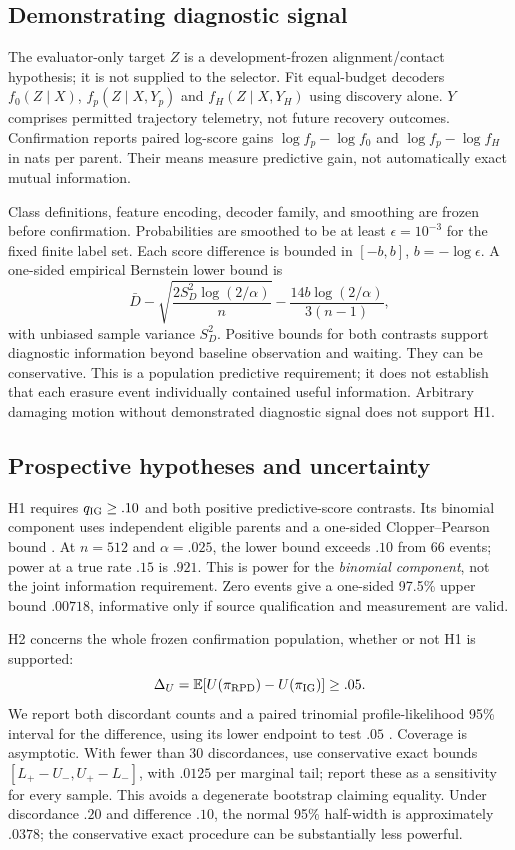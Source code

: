 \documentclass[conference]{IEEEtran}
\newcommand{\E}{\mathbb E}
\begin{document}
\subsection{Demonstrating diagnostic signal}
The evaluator-only target $Z$ is a development-frozen alignment/contact hypothesis; it is not supplied to the selector. Fit equal-budget decoders $f_0(Z\mid X)$, $f_p(Z\mid X,Y_p)$ and $f_H(Z\mid X,Y_H)$ using discovery alone. $Y$ comprises permitted trajectory telemetry, not future recovery outcomes. Confirmation reports paired log-score gains $\log f_p-\log f_0$ and $\log f_p-\log f_H$ in nats per parent. Their means measure predictive gain, not automatically exact mutual information.

Class definitions, feature encoding, decoder family, and smoothing are frozen before confirmation. Probabilities are smoothed to be at least $\epsilon=10^{-3}$ for the fixed finite label set. Each score difference is bounded in $[-b,b]$, $b=-\log\epsilon$. A one-sided empirical Bernstein lower bound \citep{maurer2009} is
\begin{equation}
\bar D-\sqrt{\frac{2S_D^2\log(2/\alpha)}{n}}
-\frac{14b\log(2/\alpha)}{3(n-1)},\label{eq:score}
\end{equation}
with unbiased sample variance $S_D^2$. Positive bounds for both contrasts support diagnostic information beyond baseline observation and waiting. They can be conservative. This is a population predictive requirement; it does not establish that each erasure event individually contained useful information. Arbitrary damaging motion without demonstrated diagnostic signal does not support H1.

\subsection{Prospective hypotheses and uncertainty}
H1 requires $q_{\rm IG}\ge .10$ and both positive predictive-score contrasts. Its binomial component uses independent eligible parents and a one-sided Clopper--Pearson bound \citep{clopper1934}. At $n=512$ and $\alpha=.025$, the lower bound exceeds $.10$ from 66 events; power at a true rate $.15$ is $.921$. This is power for the \emph{binomial component}, not the joint information requirement. Zero events give a one-sided 97.5\% upper bound $.00718$, informative only if source qualification and measurement are valid.

H2 concerns the whole frozen confirmation population, whether or not H1 is supported:
\begin{equation}
\Delta_U=\E[U(\pi_{\rm RPD})-U(\pi_{\rm IG})]\ge .05.\label{eq:H2}
\end{equation}
We report both discordant counts and a paired trinomial profile-likelihood 95\% interval for the difference, using its lower endpoint to test $.05$ \citep{wilks1938}. Coverage is asymptotic. With fewer than 30 discordances, use conservative exact bounds $[L_{+}-U_{-},U_{+}-L_{-}]$, with $.0125$ per marginal tail; report these as a sensitivity for every sample. This avoids a degenerate bootstrap claiming equality. Under discordance $.20$ and difference $.10$, the normal 95\% half-width is approximately $.0378$; the conservative exact procedure can be substantially less powerful.
\end{document}
